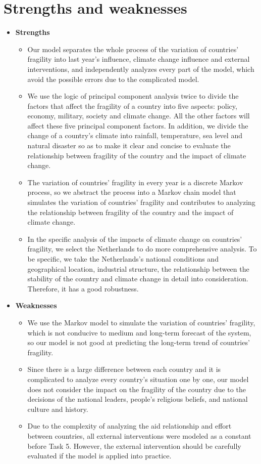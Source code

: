 \documentclass{mcmthesis}
\begin{document}
	\section{Strengths and weaknesses}
	\begin{itemize}
		\item \large{\textbf{Strengths}}
		\begin{itemize}
			\item Our model separates the whole process of the variation of countries’ fragility into last year’s influence, climate change influence and external interventions, and independently analyzes every part of the model, which avoid the possible errors due to the complicated model.
			\item We use the logic of principal component analysis twice to divide the factors that affect the fragility of a country into five aspects: policy, economy, military, society and climate change. All the other factors will affect these five principal component factors. In addition, we divide the change of a country's climate into rainfall, temperature, sea level and natural disaster so as to make it clear and concise to evaluate the relationship between fragility of the country and the impact of climate change.
			\item The variation of countries’ fragility in every year is a discrete Markov process, so we abstract the process into a Markov chain model that simulates the variation of countries’ fragility and contributes to analyzing the relationship between fragility of the country and the impact of climate change.		
			\item In the specific analysis of the impacts of climate change on countries’ fragility, we select the Netherlands to do more comprehensive analysis. To be specific, we take the Netherlands's national conditions and geographical location, industrial structure, the relationship between the stability of the country and climate change in detail into consideration. Therefore, it has a good robustness.	
		\end{itemize}

		\item \large{\textbf{Weaknesses}}
			\begin{itemize}
				\item We use the Markov model to simulate the variation of countries’ fragility, which is not conducive to medium and long-term forecast of the system, so our model is not good at predicting the long-term trend of countries’ fragility.
				\item Since there is a large difference between each country and it is complicated to analyze every country’s situation one by one, our model does not consider the impact on the fragility of the country due to the decisions of the national leaders, people's religious beliefs, and national culture and history.
				\item Due to the complexity of analyzing the aid relationship and effort between countries, all external interventions were modeled as a constant before Task 5. However, the external intervention should be carefully evaluated if the model is applied into practice.
			\end{itemize}
	\end{itemize}
\end{document}
